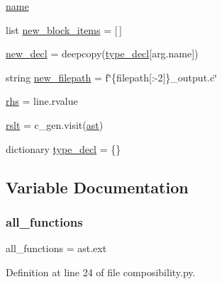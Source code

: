 \begin{DoxyCompactItemize}
\item 
\hyperlink{namespaceRegBalancer_1_1src_1_1composibility_ab74e6bf80237ddc4109968cedc58c151}{name}
\item 
list \hyperlink{namespaceRegBalancer_1_1src_1_1composibility_a8ad9b335145f9b7a76cc1e6e2423cf0c}{new\+\_\+block\+\_\+items} = \mbox{[}$\,$\mbox{]}
\item 
\hyperlink{namespaceRegBalancer_1_1src_1_1composibility_a1653f591881c9ae74c9113cd4af0e30f}{new\+\_\+decl} = deepcopy(\hyperlink{namespaceRegBalancer_1_1src_1_1composibility_a3993b1a481d9e52328b2399c5ec6c791}{type\+\_\+decl}\mbox{[}arg.\+name\mbox{]})
\item 
string \hyperlink{namespaceRegBalancer_1_1src_1_1composibility_aa6afe46260181a45f14175dd7c70dc5e}{new\+\_\+filepath} = f\char`\"{}\{filepath\mbox{[}\+:-\/2\mbox{]}\}\+\_\+output.\+c\char`\"{}
\item 
\hyperlink{namespaceRegBalancer_1_1src_1_1composibility_ac7f01b5df0ebd2339035b77990cda224}{rhs} = line.\+rvalue
\item 
\hyperlink{namespaceRegBalancer_1_1src_1_1composibility_ac08a79afda9b81d9c7649a4d2134905f}{rslt} = c\+\_\+gen.\+visit(\hyperlink{namespaceRegBalancer_1_1src_1_1composibility_a83d838e3813fb5999c0492e0d9474bd9}{ast})
\item 
dictionary \hyperlink{namespaceRegBalancer_1_1src_1_1composibility_a3993b1a481d9e52328b2399c5ec6c791}{type\+\_\+decl} = \{\}
\end{DoxyCompactItemize}


\subsection{Variable Documentation}
\mbox{\label{namespaceRegBalancer_1_1src_1_1composibility_a66fdaaee4f1e3923f619ce48cda79c4b}} 
\subsubsection{\texorpdfstring{all\+\_\+functions}{all\_functions}}
{\footnotesize\ttfamily all\+\_\+functions = ast.\+ext}



Definition at line 24 of file composibility.\+py.

